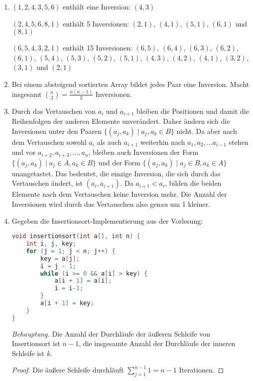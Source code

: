 \documentclass[11pt,a4paper]{article}
\begin{document}
\begin{loesung}
    \begin{enumerate}
        \item $(1, 2, 4, 3, 5, 6)$ enthält eine Inversion: $(4, 3)$ 

        $(2, 4, 5, 6, 8, 1)$ enthält 5 Inversionen: $(2, 1)$, $(4, 1)$, $(5, 1)$, $(6, 1)$ und $(8, 1)$ 

        $(6, 5, 4, 3, 2, 1)$ enthält 15 Inversionen: $(6, 5)$, $(6, 4)$, $(6, 3)$, $(6, 2)$, $(6, 1)$, $(5, 4)$, $(5, 3)$, $(5, 2)$, $(5, 1)$, $(4, 3)$, $(4, 2)$, $(4, 1)$, $(3, 2)$, $(3, 1)$ und $(2, 1)$

        \item Bei einem absteigend sortierten Array bildet jedes Paar eine Inversion. Macht insgesamt $\binom{n}{2} = \frac{n (n - 1)}{2}$ Inversionen.


        \item 
        Durch das Vertauschen von $a_i$ und $a_{i + 1}$ bleiben die Positionen und damit die Reihenfolgen der anderen Elemente unverändert. Daher ändern sich die Inversionen unter den Paaren $\{(a_j, a_k) \mid a_j, a_k \in B\}$ nicht.
        Da aber nach dem Vertauschen sowohl $a_i$ als auch $a_{i + 1}$ weiterhin nach $a_1, a_2, \ldots a_{i - 1}$ stehen und vor $a_{i + 2}, a_{i + 3}, \ldots, a_n$, bleiben auch Inversionen der Form $\{(a_j, a_k) \mid a_j \in A, a_k \in B\}$ und der Form $\{(a_j, a_k) \mid a_j \in B, a_k \in A\}$ unangetastet.
        Das bedeutet, die einzige Inversion, die sich durch das Vertauschen ändert, ist $(a_i, a_{i + 1})$. 
        Da $a_{i + 1} < a_i$, bilden die beiden Elemente nach dem Vertauschen keine Inversion mehr.
        Die Anzahl der Inversionen wird durch das Vertauschen also genau um 1 kleiner.

        \item
        Gegeben die Insertionsort-Implementierung aus der Vorlesung:
        \begin{lstlisting}[language=c++]
void insertionsort(int a[], int n) {
    int i, j, key;
    for (j = 1; j < n; j++) {
        key = a[j];
        i = j - 1; 
        while (i >= 0 && a[i] > key) { 
            a[i + 1] = a[i];
            i = i-1;
        }
        a[i + 1] = key;
    }
} 
        \end{lstlisting}
        \textit{Behauptung.} Die Anzahl der Durchläufe der äußeren Schleife von Insertionsort ist $n - 1$, die insgesamte Anzahl der Durchläufe der inneren Schleife ist $k$.
        \begin{proof}
            Die äußere Schleife durchläuft $\sum_{j = 1}^{n - 1} 1 = n - 1$ Iterationen.


\end{proof}
\end{enumerate}
\end{loesung}
\end{document}
